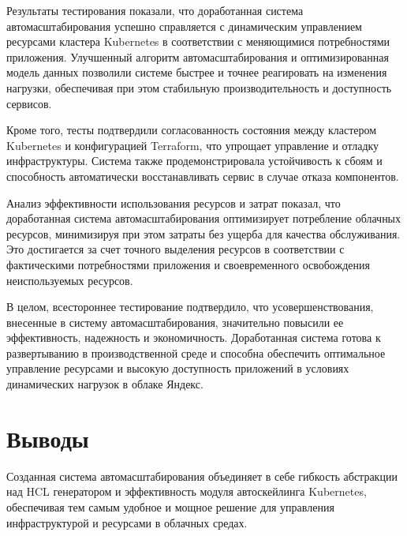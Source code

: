    Результаты тестирования показали, что доработанная система
автомасштабирования успешно справляется с динамическим управлением ресурсами
кластера Kubernetes в соответствии с меняющимися потребностями приложения.
Улучшенный алгоритм автомасштабирования и оптимизированная модель данных
позволили системе быстрее и точнее реагировать на изменения нагрузки,
обеспечивая при этом стабильную производительность и доступность сервисов.
   
   Кроме того, тесты подтвердили согласованность состояния между кластером
Kubernetes и конфигурацией Terraform, что упрощает управление и отладку
инфраструктуры. Система также продемонстрировала устойчивость к сбоям и
способность автоматически восстанавливать сервис в случае отказа компонентов.
   
   Анализ эффективности использования ресурсов и затрат показал, что
доработанная система автомасштабирования оптимизирует потребление облачных
ресурсов, минимизируя при этом затраты без ущерба для качества обслуживания. Это
достигается за счет точного выделения ресурсов в соответствии с фактическими
потребностями приложения и своевременного освобождения неиспользуемых ресурсов.
   
   В целом, всестороннее тестирование подтвердило, что усовершенствования,
внесенные в систему автомасштабирования, значительно повысили ее эффективность,
надежность и экономичность. Доработанная система готова к развертыванию в
производственной среде и способна обеспечить оптимальное управление ресурсами и
высокую доступность приложений в условиях динамических нагрузок в облаке Яндекс.

\section{Выводы}

Созданная система автомасштабирования объединяет в себе гибкость абстракции над
HCL генератором и эффективность модуля автоскейлинга Kubernetes, обеспечивая тем
самым удобное и мощное решение для управления инфраструктурой и ресурсами в
облачных средах.